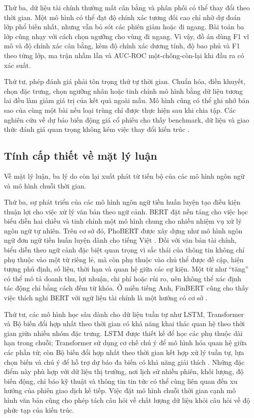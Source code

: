 Thứ ba, dữ liệu tài chính thường mất cân bằng và phân phối có thể thay đổi theo thời
gian. Một mô hình có thể đạt độ chính xác tương đối cao chỉ nhờ dự đoán lớp phổ biến
nhất, nhưng vẫn bỏ sót các phiên giảm hoặc đi ngang. Bài toán ba lớp cũng nhạy với cách chọn ngưỡng
cho vùng đi ngang. Vì vậy, đồ án dùng F1 vĩ mô và độ chính xác cân bằng, kèm độ chính xác dương tính,
độ bao phủ và F1 theo từng lớp, ma trận nhầm lẫn và AUC-ROC một-chống-còn-lại khi đầu ra có xác suất.

Thứ tư, phép đánh giá phải tôn trọng thứ tự thời gian. Chuẩn hóa, điền khuyết, chọn
đặc trưng, chọn ngưỡng nhãn hoặc tinh chỉnh mô hình bằng dữ liệu tương lai đều làm giảm
giá trị của kết quả ngoài mẫu. Mô hình cũng có thể ghi nhớ bản sao của cùng một bài nếu
loại trùng chỉ được thực hiện sau khi chia tập. Các nghiên cứu về dự báo biến động giá
cổ phiếu cho thấy benchmark, dữ liệu và giao thức đánh giá quan trọng không kém việc
thay đổi kiến trúc \cite{Feng2018_181009936v2,Chen2021_210708721v1}.


\subsection{Tính cấp thiết về mặt lý luận}

Về mặt lý luận, ba lý do còn lại xuất phát từ tiến bộ của các mô hình ngôn ngữ và
mô hình chuỗi thời gian.

Thứ ba, sự phát triển của các mô hình ngôn ngữ tiền huấn luyện tạo điều kiện thuận lợi
cho việc xử lý văn bản theo ngữ cảnh. BERT đặt nền tảng cho việc học biểu diễn hai chiều
và tinh chỉnh một mô hình chung cho nhiều nhiệm vụ xử lý ngôn ngữ tự nhiên. Trên cơ sở
đó, PhoBERT được xây dựng như mô hình ngôn ngữ đơn ngữ tiền huấn luyện dành cho tiếng
Việt \cite{Nguyen2020_200300744v3}. Đối với văn bản tài chính, biểu diễn theo ngữ cảnh
đặc biệt quan trọng vì sắc thái của thông tin không chỉ phụ thuộc vào một từ riêng lẻ,
mà còn phụ thuộc vào chủ thể được đề cập, hiện tượng phủ định, số liệu, thời hạn và
quan hệ giữa các sự kiện. Một từ như ``tăng'' có thể mô tả doanh thu, lợi nhuận, chi
phí hoặc rủi ro, nên không thể xác định tác động chỉ bằng cách đếm từ khóa. Ở miền
tiếng Anh, FinBERT cũng cho thấy việc thích nghi BERT với ngữ liệu tài chính là một
hướng có cơ sở \cite{Yang2020_200608097v2}.

Thứ tư, các mô hình học sâu dành cho dữ liệu tuần tự như LSTM, Transformer và Bộ biến đổi hợp nhất theo thời gian có khả năng khai thác quan hệ theo thời gian giữa nhiều nhóm đặc
trưng. LSTM được thiết kế để học các phụ thuộc dài hạn trong chuỗi; Transformer sử
dụng cơ chế chú ý để mô hình hóa quan hệ giữa các phần tử; còn Bộ biến đổi hợp nhất theo thời gian kết hợp xử lý tuần tự, lựa chọn biến và chú ý để hỗ trợ dự báo đa biến
có khả năng giải thích \cite{Feng2018_181009936v2,Omranpour2024_241210540v1}. Những
đặc điểm này phù hợp với dữ liệu thị trường, nơi lịch sử nhiều phiên, khối lượng, độ
biến động, chỉ báo kỹ thuật và thông tin tin tức có thể cùng liên quan đến xu hướng của
phiên giao dịch kế tiếp. Việc đặt mô hình chuỗi thời gian cạnh mô hình văn bản cũng
cho phép tách câu hỏi về chất lượng dữ liệu khỏi câu hỏi về độ phức tạp của kiến trúc.

